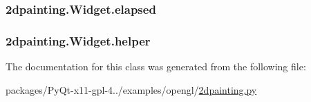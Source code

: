 \subsubsection[{elapsed}]{\setlength{\rightskip}{0pt plus 5cm}2dpainting.\+Widget.\+elapsed}\label{class2dpainting_1_1Widget_a85f3733f17c3512b3ed02036de494132}
\hypertarget{class2dpainting_1_1Widget_adbc815e383f5979e902b3f41619b8997}{}
\subsubsection[{helper}]{\setlength{\rightskip}{0pt plus 5cm}2dpainting.\+Widget.\+helper}\label{class2dpainting_1_1Widget_adbc815e383f5979e902b3f41619b8997}


The documentation for this class was generated from the following file\+:\begin{DoxyCompactItemize}
\item 
packages/\+Py\+Qt-\/x11-\/gpl-\/4../examples/opengl/\hyperlink{2dpainting_8py}{2dpainting.\+py}\end{DoxyCompactItemize}
